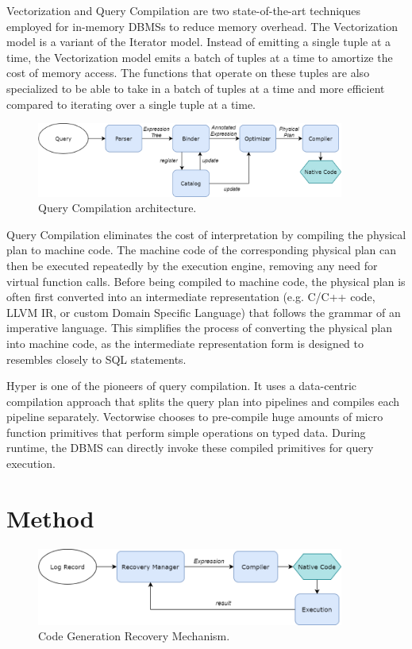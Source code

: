 \documentclass[12pt]{cmuthesis}
\begin{document}
Vectorization and Query Compilation are two state-of-the-art techniques employed for in-memory DBMSs to reduce memory overhead\cite{kersten18}. The Vectorization model is a variant of the Iterator model. Instead of emitting a single tuple at a time, the Vectorization model emits a batch of tuples at a time to amortize the cost of memory access. The functions that operate on these tuples are also specialized to be able to take in a batch of tuples at a time and more efficient compared to iterating over a single tuple at a time.

\begin{figure}[H]
\centering
\includegraphics[width=0.9\textwidth]{images/QueryCompilation.png}
\caption{Query Compilation architecture.}
\label{fig:query_compilation}
\end{figure}

Query Compilation eliminates the cost of interpretation by compiling the physical plan to machine code. The machine code of the corresponding physical plan can then be executed repeatedly by the execution engine, removing any need for virtual function calls. Before being compiled to machine code, the physical plan is often first converted into an intermediate representation (e.g. C/C++ code, LLVM IR, or custom Domain Specific Language) that follows the grammar of an imperative language. This simplifies the process of converting the physical plan into machine code, as the intermediate representation form is designed to resembles closely to SQL statements. 

Hyper\cite{neumann11} is one of the pioneers of query compilation. It uses a data-centric compilation approach that splits the query plan into pipelines and compiles each pipeline separately. Vectorwise\cite{raducanu13} chooses to pre-compile huge amounts of micro function primitives that perform simple operations on typed data. During runtime, the DBMS can directly invoke these compiled primitives for query execution.

\chapter{Method}
\begin{figure}[H]
\centering
\includegraphics[width=0.9\textwidth]{images/Proposal.png}
\caption{Code Generation Recovery Mechanism.}
\label{fig:codegen_recovery}
\end{figure}
\end{document}

